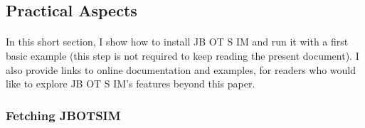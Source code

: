 \subsection{Practical Aspects}
\paragraph{}In this short section, I show how to install JB OT S IM and run it with a first basic example (this step is not required to keep reading the present document). I also provide links to online documentation and examples, for readers who would like to explore JB OT S IM’s features beyond this paper.
\subsubsection{Fetching JBOTSIM}
